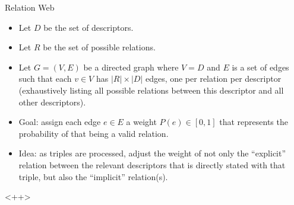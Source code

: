 \documentclass[a4paper]{article}
\begin{document}
Relation Web
\begin{itemize}
    \item Let $D$ be the set of descriptors.
    \item Let $R$ be the set of possible relations.
    \item Let $G = \left( V, E \right)$ be a directed graph where $V = D$ and
        $E$ is a set of edges such that each $v \in V$ has $|R| \times |D|$
        edges, one per relation per descriptor (exhaustively listing all 
        possible relations between this descriptor and all other descriptors).
    \item Goal: assign each edge $e \in E$ a weight $P(e) \in [0, 1]$ that
        represents the probability of that being a valid relation.
    \item Idea: as triples are processed, adjust the weight of not only the 
        ``explicit'' relation between the relevant descriptors that is directly
        stated with that triple, but also the ``implicit'' relation(s).
\end{itemize}<++>

\end{document}

